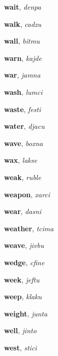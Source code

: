 \documentclass[12pt]{book}
\begin{document}
\begin{description}

\item[ ] \textbf{wait}, \textit{denpa}

\item[ ] \textbf{walk}, \textit{cadzu}

\item[ ] \textbf{wall}, \textit{bitmu}

\item[ ] \textbf{warn}, \textit{kajde}

\item[ ] \textbf{war}, \textit{jamna}

\item[ ] \textbf{wash}, \textit{lumci}

\item[ ] \textbf{waste}, \textit{festi}

\item[ ] \textbf{water}, \textit{djacu}

\item[ ] \textbf{wave}, \textit{boxna}

\item[ ] \textbf{wax}, \textit{lakse}

\item[ ] \textbf{weak}, \textit{ruble}

\item[ ] \textbf{weapon}, \textit{xarci}

\item[ ] \textbf{wear}, \textit{dasni}

\item[ ] \textbf{weather}, \textit{tcima}

\item[ ] \textbf{weave}, \textit{jivbu}

\item[ ] \textbf{wedge}, \textit{cfine}

\item[ ] \textbf{week}, \textit{jeftu}

\item[ ] \textbf{weep}, \textit{klaku}

\item[ ] \textbf{weight}, \textit{junta}

\item[ ] \textbf{well}, \textit{jinto}

\item[ ] \textbf{west}, \textit{stici}


\end{description}
\end{document}

